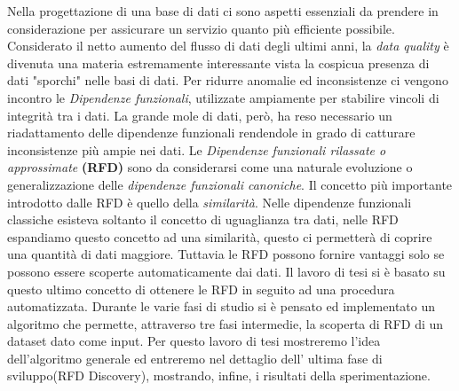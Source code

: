 Nella progettazione di una base di dati ci sono aspetti essenziali da prendere in considerazione per assicurare un servizio quanto più efficiente possibile.
Considerato il netto aumento del flusso di dati degli ultimi anni,  la \emph{data quality} è divenuta una materia estremamente interessante vista la cospicua presenza di dati "sporchi" nelle basi di dati.
Per ridurre anomalie ed inconsistenze ci vengono incontro le \emph{Dipendenze funzionali}, utilizzate ampiamente per stabilire vincoli di integrità tra i dati.
La grande mole di dati, però, ha reso necessario un riadattamento delle dipendenze funzionali rendendole in grado di catturare inconsistenze più ampie nei dati. 
Le \emph{Dipendenze funzionali rilassate o approssimate} \textbf{(RFD)} sono da considerarsi come una naturale evoluzione o generalizzazione delle \emph{dipendenze funzionali canoniche}.
Il concetto più importante introdotto dalle RFD è quello della \emph{similarità}.
Nelle dipendenze funzionali classiche esisteva soltanto il concetto di uguaglianza tra dati, nelle RFD espandiamo questo concetto ad una similarità, questo ci permetterà di coprire una quantità di dati maggiore.
Tuttavia le RFD possono fornire vantaggi solo se possono essere scoperte automaticamente dai dati.
Il lavoro di tesi si è basato su questo ultimo concetto di ottenere le RFD in seguito ad una procedura automatizzata.
Durante le varie fasi di studio si è pensato ed implementato un algoritmo che permette, attraverso tre fasi intermedie, la scoperta di RFD di un dataset dato come input.
Per questo lavoro di tesi mostreremo l'idea dell'algoritmo generale ed entreremo nel dettaglio dell' ultima fase di sviluppo(RFD Discovery), mostrando, infine, i risultati della sperimentazione.

